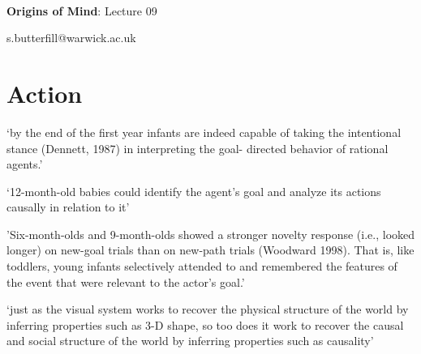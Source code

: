 \documentclass[12pt]{extarticle}
\date{}
\makeatletter
\def \ititle {Origins of Mind}
\def \isubtitle {Lecture 08}
\def \iemail{s.butterfill@warwick.ac.uk}
\makeatother
\begin{document}
\begin{multicols}{3}

\setlength\footnotesep{1em}









\def \ititle {Origins of Mind}
 
\def \isubtitle {Lecture 09}
 
 
 
\
 
 
 
\begin{center}
 
{\Large
 
\textbf{\ititle}: \isubtitle
 
}
 
 
 
\iemail %
 
\end{center}
 
 
 
\section{Action}
 
‘by the end of the first year infants are indeed capable of taking the intentional stance (Dennett, 1987) in interpreting the goal- directed behavior of rational agents.’
\citep[p.\ 184]{Gergely:1995sq}
 
‘12-month-old babies could identify the agent’s goal and analyze its actions causally in relation to it’
\citep[p.\ 190]{Gergely:1995sq}
 
'Six-month-olds and 9-month-olds showed a stronger novelty response (i.e., looked longer) on new-goal trials than on new-path trials (Woodward 1998). That is, like toddlers, young infants selectively attended to and remembered the features of the event that were relevant to the actor’s goal.'
\citep[p.\ 153]{woodward:2001_making}
 
‘just as the visual system works to recover the physical structure of the world by inferring properties such as 3-D shape, so too does it work to recover the causal and social structure of the world by inferring properties such as causality’
\citep[p.\ 299]{Scholl:2000eq}
 

\end{multicols}
\end{document}
